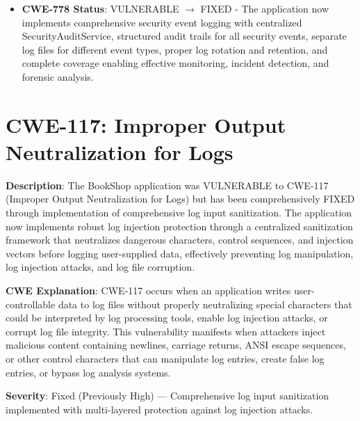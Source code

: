 \documentclass[]{UCD_CS_FYP_Report}
\begin{document}
\begin{itemize}
	\item \textbf{CWE-778 Status}: VULNERABLE $\rightarrow$ FIXED - The application now implements comprehensive security event logging with centralized SecurityAuditService, structured audit trails for all security events, separate log files for different event types, proper log rotation and retention, and complete coverage enabling effective monitoring, incident detection, and forensic analysis.
\end{itemize}


\section{CWE-117: Improper Output Neutralization for Logs}

\textbf{Description}: The BookShop application was VULNERABLE to CWE-117 (Improper Output Neutralization for Logs) but has been comprehensively FIXED through implementation of comprehensive log input sanitization. The application now implements robust log injection protection through a centralized sanitization framework that neutralizes dangerous characters, control sequences, and injection vectors before logging user-supplied data, effectively preventing log manipulation, log injection attacks, and log file corruption.

\textbf{CWE Explanation}: CWE-117 occurs when an application writes user-controllable data to log files without properly neutralizing special characters that could be interpreted by log processing tools, enable log injection attacks, or corrupt log file integrity. This vulnerability manifests when attackers inject malicious content containing newlines, carriage returns, ANSI escape sequences, or other control characters that can manipulate log entries, create false log entries, or bypass log analysis systems.

\textbf{Severity}: Fixed (Previously High) — Comprehensive log input sanitization implemented with multi-layered protection against log injection attacks.
\end{document}
